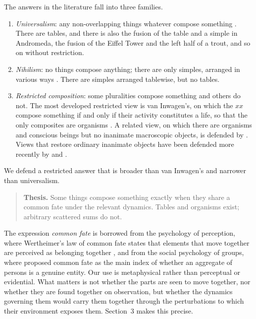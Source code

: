 \documentclass{situationist-preprint}
\begin{document}
The answers in the literature fall into three families.
\begin{enumerate}[label=(\roman*)]
\item \emph{Universalism}: any non-overlapping things whatever compose something \citep{Lewis1986,Lewis1991,Sider2001}. There are tables, and there is also the fusion of the table and a simple in Andromeda, the fusion of the Eiffel Tower and the left half of a trout, and so on without restriction.
\item \emph{Nihilism}: no things compose anything; there are only simples, arranged in various ways \citep{Unger1979,RosenDorr2002,Sider2013}. There are simples arranged tablewise, but no tables.
\item \emph{Restricted composition}: some pluralities compose something and others do not. The most developed restricted view is van Inwagen's, on which the $xx$ compose something if and only if their activity constitutes a life, so that the only composites are organisms \citep{vanInwagen1990}. A related view, on which there are organisms and conscious beings but no inanimate macroscopic objects, is defended by \citet{Merricks2001}. Views that restore ordinary inanimate objects have been defended more recently by \citet{Korman2015} and \citet{Carmichael2015}.
\end{enumerate}

We defend a restricted answer that is broader than van Inwagen's and narrower than universalism.

\begin{quote}
\textbf{Thesis.} Some things compose something exactly when they share a common fate under the relevant dynamics. Tables and organisms exist; arbitrary scattered sums do not.
\end{quote}

The expression \emph{common fate} is borrowed from the psychology of perception, where Wertheimer's law of common fate states that elements that move together are perceived as belonging together \citep{Wertheimer1923}, and from the social psychology of groups, where \citet{Campbell1958} proposed common fate as the main index of whether an aggregate of persons is a genuine entity. Our use is metaphysical rather than perceptual or evidential. What matters is not whether the parts are seen to move together, nor whether they are found together on observation, but whether the dynamics governing them would carry them together through the perturbations to which their environment exposes them. Section~3 makes this precise.
\end{document}
